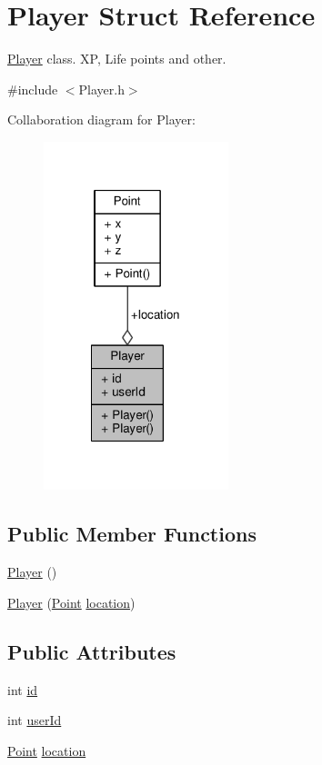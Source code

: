 \hypertarget{struct_player}{\section{Player Struct Reference}
\label{struct_player}
}


\hyperlink{struct_player}{Player} class. X\-P, Life points and other.  




{\ttfamily \#include $<$Player.\-h$>$}



Collaboration diagram for Player\-:
\nopagebreak
\begin{figure}[H]
\begin{center}
\leavevmode
\includegraphics[width=152pt]{struct_player__coll__graph}
\end{center}
\end{figure}
\subsection*{Public Member Functions}
\begin{DoxyCompactItemize}
\item 
\hyperlink{struct_player_affe0cc3cb714f6deb4e62f0c0d3f1fd8}{Player} ()
\item 
\hyperlink{struct_player_ad1c9500a9f02f1055209e1d0e33e27e5}{Player} (\hyperlink{struct_point}{Point} \hyperlink{struct_player_adfb7d7a2aa0757fa7bf5a570b74528db}{location})
\end{DoxyCompactItemize}
\subsection*{Public Attributes}
\begin{DoxyCompactItemize}
\item 
int \hyperlink{struct_player_a05e05f3a23de78da7ec032ec2bcf8c6c}{id}
\item 
int \hyperlink{struct_player_a5c801c5fa6666baddd65a2863cc6e7f2}{user\-Id}
\item 
\hyperlink{struct_point}{Point} \hyperlink{struct_player_adfb7d7a2aa0757fa7bf5a570b74528db}{location}
\end{DoxyCompactItemize}


